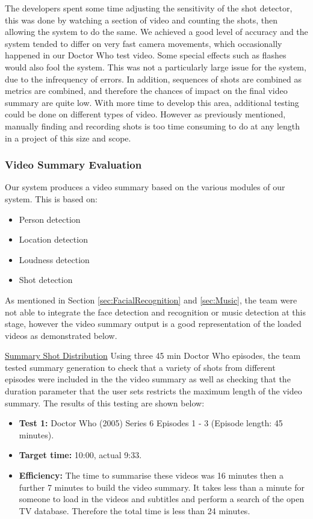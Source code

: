 The developers spent some time adjusting the sensitivity of the shot detector, this was done by watching a section of video and counting the shots, then allowing the system to do the same. We achieved a good level of accuracy and the system tended to differ on very fast camera movements, which occasionally happened in our Doctor Who test video. Some special effects such as flashes would also fool the system. This was not a particularly large issue for the system, due to the infrequency of errors. In addition, sequences of shots are combined as metrics are combined, and therefore the chances of impact on the final video summary are quite low. With more time to develop this area, additional testing could be done on different types of video. However as previously mentioned, manually finding and recording shots is too time consuming to do at any length in a project of this size and scope.

\subsubsection{Video Summary Evaluation}
Our system produces a video summary based on the various modules of our system. This
is based on:
\begin{itemize}
	\item{Person detection}
	\item{Location detection}
	\item{Loudness detection}
	\item{Shot detection}
\end{itemize}

As mentioned in Section \ref{sec:FacialRecognition} and \ref{sec:Music}, the team were not able to integrate the face detection and recognition or music detection at this stage, however the video summary output is a good representation of the loaded videos as demonstrated below.

\underline{Summary Shot Distribution}
\newline
Using three 45 min Doctor Who episodes, the team tested summary generation to check that a variety of shots from different episodes were included in the the video summary as well as checking that the duration parameter that the user sets restricts the maximum length of the video summary. The results of this testing are shown below:

\begin{itemize}
	\item{\textbf{Test 1:} Doctor Who (2005) Series 6 Episodes 1 - 3 (Episode length: 45 minutes).}
	\item{\textbf{Target time:} 10:00, actual 9:33.}
	\item{\textbf{Efficiency:} The time to summarise these videos was 16 minutes then a further 7 minutes to build the video summary. It takes less than a minute for someone to load in the videos and subtitles and perform a search of the open TV database. Therefore the total time is less than 24 minutes.}
\end{itemize}

